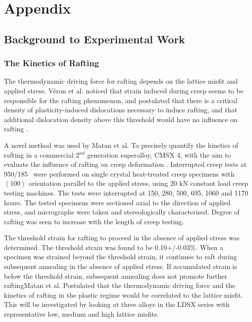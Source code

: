 \chapter{Appendix}
\section{Background to Experimental Work}
\subsection{The Kinetics of Rafting}

The thermodynamic driving force for rafting depends on the lattice misfit and applied stress.  V\'{e}ron et al. noticed that strain induced during creep seems to be responsible for the rafting phenomenon, and postulated that there is a critical density of plasticity-induced dislocations necessary to induce rafting, and that additional dislocation density above this threshold would have no influence on rafting \cite{veron96}.

A novel method was used by Matan et al.  To precisely quantify the kinetics of rafting in a commercial 2$^{nd}$ generation superalloy, CMSX 4, with the aim to evaluate the influence of rafting on creep deformation \cite{matan99}.  Interrupted creep tests at 950\celsius/185 \mega\pascal\ were performed on single crystal heat-treated creep specimens with $\left<100\right>$ orientation parallel to the applied stress, using 20 kN constant load creep testing machines.  The tests were interrupted  at 150, 280, 500, 695, 1060 and 1170 hours.  The tested specimens were sectioned axial to the direction of applied stress, and micrographs were taken and stereologically characterised.  Degree of rafting was seen to increase with the length of creep testing.

The threshold strain for rafting to proceed in the absence of applied stress was determined.  The threshold strain was found to be 0.10+/-0.03\%.  When a specimen was strained beyond the threshold strain, it continues to raft during subsequent annealing in the absence of applied stress.  If accumulated strain is below the threshold strain, subsequent annealing does not promote further raftingMatan et al.  Postulated that the thermodynamic driving force and the kinetics of rafting in the plastic regime would be correlated to the lattice misfit.  This will be investigated by looking at three alloys in the LDSX series with representative low, medium and high lattice misfits.

